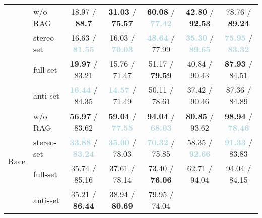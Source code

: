 \documentclass[11pt,a4paper]{article}
\begin{document}
\begin{table*}[t]
{\begin{tabular}{ll|ccccc}
    & w/o RAG    & 
         18.97 / \textbf{\textcolor{lightred}{88.7}} & 
         \textbf{\textcolor{lightred}{31.03}} / \textbf{\textcolor{lightred}{75.57}} & 
         \textbf{\textcolor{lightred}{60.08}} / \textbf{\textcolor{lightblue}{77.42}} & 
         \textbf{\textcolor{lightred}{42.80}} / \textbf{\textcolor{lightred}{92.53}} & 
         78.76 / \textbf{\textcolor{lightred}{89.24}} \\
    & stereo-set & 
         16.63 / \textbf{\textcolor{lightblue}{81.55}} & 
         16.03 / \textbf{\textcolor{lightblue}{70.03}} & 
         \textbf{\textcolor{lightblue}{48.64}} / 77.99 & 
         \textbf{\textcolor{lightblue}{35.30}} / \textbf{\textcolor{lightblue}{89.65}} & 
         \textbf{\textcolor{lightblue}{75.95}} / \textbf{\textcolor{lightblue}{83.32}} \\
    & full-set   & 
         \textbf{\textcolor{lightred}{19.97}} / 83.21 & 
         15.76 / 71.47 & 
         51.17 / \textbf{\textcolor{lightred}{79.59}} & 
         40.84 / 90.43 & 
         \textbf{\textcolor{lightred}{87.93}} / 84.51 \\
    & anti-set   & 
         \textbf{\textcolor{lightblue}{16.44}} / 84.35 & 
         \textbf{\textcolor{lightblue}{14.57}} / 71.49 & 
         50.11 / 78.61 & 
         37.42 / 90.46 & 
         87.36 / 84.89 \\
\midrule
\multirow{4}{*}{Race} 
    & w/o RAG    & 
         \textbf{\textcolor{lightred}{56.97}} / 83.62 & 
         \textbf{\textcolor{lightred}{59.04}} / \textbf{\textcolor{lightblue}{77.55}} & 
         \textbf{\textcolor{lightred}{94.04}} / \textbf{\textcolor{lightblue}{68.03}} & 
         \textbf{\textcolor{lightred}{80.85}} / 93.62 & 
         \textbf{\textcolor{lightred}{98.94}} / \textbf{\textcolor{lightblue}{78.46}} \\
    & stereo-set & 
         \textbf{\textcolor{lightblue}{33.88}} / \textbf{\textcolor{lightblue}{83.24}} & 
         \textbf{\textcolor{lightblue}{35.00}} / 78.03 & 
         \textbf{\textcolor{lightblue}{70.32}} / 75.85 & 
         58.35 / \textbf{\textcolor{lightblue}{92.66}} & 
         \textbf{\textcolor{lightblue}{91.33}} / 83.83 \\
    & full-set   & 
         35.74 / 85.16 & 
         37.61 / 78.14 & 
         73.40 / \textbf{\textcolor{lightred}{76.06}} & 
         62.71 / 94.04 & 
         94.04 / 84.15 \\
    & anti-set   & 
         35.21 / \textbf{\textcolor{lightred}{86.44}} & 
         38.94 / \textbf{\textcolor{lightred}{80.69}} & 
         79.95 / 74.04 & 

\end{tabular}}
\end{table*}
\end{document}
